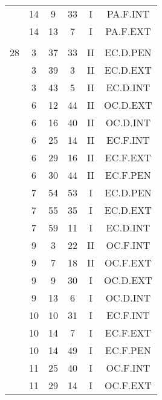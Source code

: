 \documentclass[12pt, a4paper]{article}
\begin{document}
\begin{multicols}{3}
{\begin{tabular}{c c c c c c}
	 	 	 	 & 14 & 9 & 33 & I & PA.F.INT\\%
	 	 	 	 & 14 & 13 & 7 & I & PA.F.EXT\\%
	 	 	 	 & & & & & \\%
	 	 	 	28 & 3 & 37 & 33 & II & EC.D.PEN\\%
	 	 	 	 & 3 & 39 & 3 & II & EC.D.EXT\\%
	 	 	 	 & 3 & 43 & 5 & II & EC.D.INT\\%
	 	 	 	 & 6 & 12 & 44 & II & OC.D.EXT\\%
	 	 	 	 & 6 & 16 & 40 & II & OC.D.INT\\%
	 	 	 	 & 6 & 25 & 14 & II & EC.F.INT\\%
	 	 	 	 & 6 & 29 & 16 & II & EC.F.EXT\\%
	 	 	 	 & 6 & 30 & 44 & II & EC.F.PEN\\%
	 	 	 	 & 7 & 54 & 53 & I & EC.D.PEN\\%
	 	 	 	 & 7 & 55 & 35 & I & EC.D.EXT\\%
	 	 	 	 & 7 & 59 & 11 & I & EC.D.INT\\%
	 	 	 	 & 9 & 3 & 22 & II & OC.F.INT\\%
	 	 	 	 & 9 & 7 & 18 & II & OC.F.EXT\\%
	 	 	 	 & 9 & 9 & 30 & I & OC.D.EXT\\%
	 	 	 	 & 9 & 13 & 6 & I & OC.D.INT\\%
	 	 	 	 & 10 & 10 & 31 & I & EC.F.INT\\%
	 	 	 	 & 10 & 14 & 7 & I & EC.F.EXT\\%
	 	 	 	 & 10 & 14 & 49 & I & EC.F.PEN\\%
	 	 	 	 & 11 & 25 & 40 & I & OC.F.INT\\%
	 	 	 	 & 11 & 29 & 14 & I & OC.F.EXT\\%

\end{tabular}}
\end{multicols}
\end{document}
